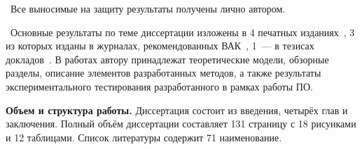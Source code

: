 \contribution\ Все выносимые на защиту результаты получены лично автором.

\publications\ Основные результаты по теме диссертации изложены в 4 печатных изданиях~\cite{summary-impl-mine,summary-intro-mine,summary-inter-unit-mine,info-2015},
3 из которых изданы в журналах, рекомендованных ВАК~\cite{summary-impl-mine,summary-intro-mine,summary-inter-unit-mine}, 
1~--- в тезисах докладов~\cite{info-2015}. В работах \cite{summary-impl-mine,summary-intro-mine,summary-inter-unit-mine} автору принадлежат теоретические модели, обзорные разделы, описание элементов разработанных методов, а также результаты экспериментального тестирования разработанного в рамках работы ПО.

\textbf{Объем и структура работы.} Диссертация состоит из введения, четырёх глав и заключения. Полный объём диссертации составляет 131 страницу с 18 рисунками и 12 таблицами. Список литературы содержит 71 наименование.


